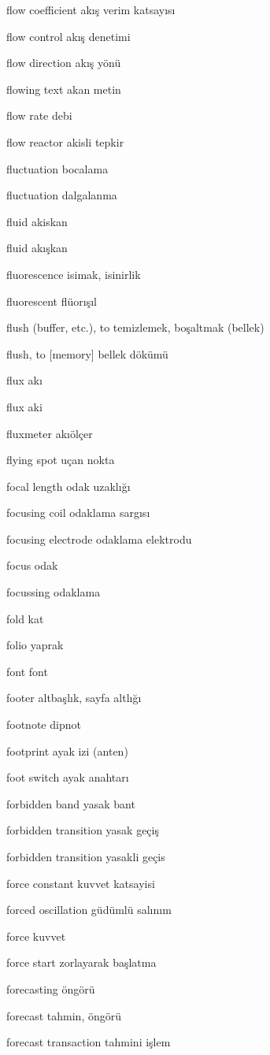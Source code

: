 \documentclass[12pt,fleqn]{article}\usepackage{../../common}
\begin{document}
flow coefficient akış verim katsayısı

flow control akış denetimi

flow direction akış yönü

flowing text akan metin

flow rate debi

flow reactor akisli tepkir

fluctuation bocalama

fluctuation dalgalanma

fluid akiskan

fluid akışkan

fluorescence isimak, isinirlik

fluorescent flüorışıl

flush (buffer, etc.), to temizlemek, boşaltmak (bellek)

flush, to [memory] bellek dökümü

flux akı

flux aki

fluxmeter akıölçer

flying spot uçan nokta

focal length odak uzaklığı

focusing coil odaklama sargısı

focusing electrode odaklama elektrodu

focus odak

focussing odaklama

fold kat

folio yaprak

font font

footer altbaşlık, sayfa altlığı

footnote dipnot

footprint ayak izi (anten)

foot switch ayak anahtarı

forbidden band yasak bant

forbidden transition yasak geçiş

forbidden transition yasakli geçis

force constant kuvvet katsayisi

forced oscillation güdümlü salınım

force kuvvet

force start zorlayarak başlatma

forecasting öngörü

forecast tahmin, öngörü

forecast transaction tahmini işlem
\end{document}
